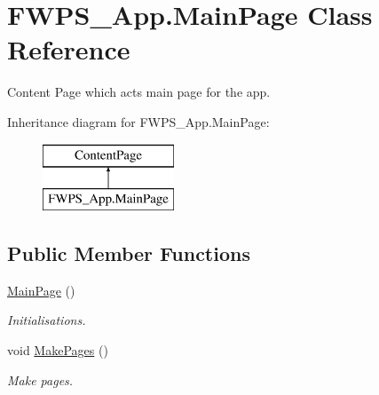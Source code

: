\hypertarget{class_f_w_p_s___app_1_1_main_page}{}\section{F\+W\+P\+S\+\_\+\+App.\+Main\+Page Class Reference}
\label{class_f_w_p_s___app_1_1_main_page}


Content Page which acts main page for the app.  


Inheritance diagram for F\+W\+P\+S\+\_\+\+App.\+Main\+Page\+:\begin{figure}[H]
\begin{center}
\leavevmode
\includegraphics[height=2.000000cm]{class_f_w_p_s___app_1_1_main_page}
\end{center}
\end{figure}
\subsection*{Public Member Functions}
\begin{DoxyCompactItemize}
\item 
\mbox{\hyperlink{class_f_w_p_s___app_1_1_main_page_a039af339b590100ab2d4377b8382f61e}{Main\+Page}} ()
\begin{DoxyCompactList}\small\item\em Initialisations. \end{DoxyCompactList}\item 
void \mbox{\hyperlink{class_f_w_p_s___app_1_1_main_page_ae361695a2f61f022f35a3d0afb9be4ef}{Make\+Pages}} ()
\begin{DoxyCompactList}\small\item\em Make pages. \end{DoxyCompactList}\end{DoxyCompactItemize}
